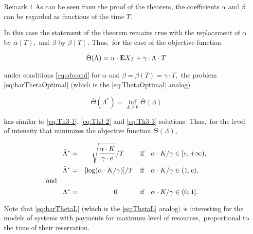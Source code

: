 \begin{newthm}{Remark 4} As can be seen from the proof of the theorem, the coefficients $\alpha$ and $\beta$ can be regarded as functions of the time $T.$ 

In this case the statement of the theorem remains true with the replacement of $\alpha$ by ${\alpha}(T),$ and $\beta$ by ${\beta}(T).$ Thus$,$ for the case of the objective function

\begin{equation}\label{eq:barThetaL}

	\bar{\Theta} (\Lambda) = \alpha \cdot{\textbf E}X_T + \gamma \cdot \Lambda \cdot T

\end{equation}

under conditions \eqref{eq:abcond} for $\alpha$ and $\beta = {\beta}(T) = \gamma \cdot T,$ the problem \eqref{eq:barThetaOptimal} $($which is the \eqref{eq:ThetaOptimal} analog$)$


\begin{equation}\label{eq:barThetaOptimal}

	\bar{\Theta} ({\Lambda}^*) = \inf_{\Lambda \geq 0}\bar{\Theta} (\Lambda)

\end{equation}

has similar to \eqref{eq:Th3-1}, \eqref{eq:Th3-2} and \eqref{eq:Th3-3} solutions$.$ Thus$,$ for the level of intensity that minimizes the objective function $\bar{\Theta} (\Lambda),$

	\begin{align}

	\label{eq:RemarkTh3-1}

\bar{\Lambda}^* & = & \sqrt{\frac{\alpha \cdot K}{\gamma \cdot e}} / T~~~~~~~ &

{\text{if$\quad \alpha \cdot K / \gamma \in [e, +\infty)$}},\\

	\label{eq:RemarkTh3-2}

\bar{\Lambda}^* & = & [\log (\alpha \cdot K / \gamma)] / T \quad & {\text{if$\quad \alpha \cdot K / \gamma \in (1, e)$}},\\

\text{and\quad\quad} \nonumber \\

	\label{eq:RemarkTh3-3}

\bar{\Lambda}^* & = & 0~~~~~~~~~~ &{\text{if$\quad \alpha \cdot K / \gamma \in (0, 1]$}}.

	\end{align}



	Note that \eqref{eq:barThetaL} $($which is the \eqref{eq:ThetaL} analog$)$ is interesting for the models of systems with payments for maximum level of resources$,$ proportional to the time of their reservation$.$

\end{newthm}






